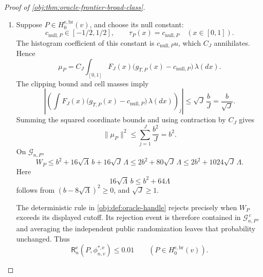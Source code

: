 \begin{proof}[Proof of \cref{obj:thm:oracle-frontier-broad-class}]
\begin{enumerate}
Define the good event by
\[
\mathcal G_{n,P}
=
\left\{\mathcal D_n:
|W_P-\|\mu_P\|^2|
\le16\bigl(\sqrt\Lambda\,\|\mu_P\|+\sqrt J\,\Lambda\bigr)
\right\}.
\]
Its tolerance is strictly positive. Applying the second-moment tail bound gives
\[
\begin{aligned}
\mathbb P_{n,P}(\mathcal G_{n,P}^{\,c})
&\le
\frac{2\Lambda\|\mu_P\|^2+J\Lambda^2}
{256\bigl(\sqrt\Lambda\,\|\mu_P\|+\sqrt J\,\Lambda\bigr)^2}\\
&\le\frac1{128}<0.01.
\end{aligned}
\]
The last inequality uses the nonnegative cross term in the denominator.

\item Suppose \(P\in H_0^{\mathrm{e,br}}(v)\), and choose its null constant:
\[
c_{\mathrm{null},P}\in[-1/2,1/2],
\qquad
\tau_P(x)=c_{\mathrm{null},P}\quad(x\in[0,1]).
\]
The histogram coefficient of this constant is \(c_{\mathrm{null},P}u\), which \(C_J\) annihilates. Hence
\[
\mu_P
=C_J\int_{[0,1]}
F_J(x)\bigl(g_{T,P}(x)-c_{\mathrm{null},P}\bigr)\,\lambda(dx).
\]
The clipping bound and cell masses imply
\[
\left|
\left(\int F_J(x)
\bigl(g_{T,P}(x)-c_{\mathrm{null},P}\bigr)\,\lambda(dx)\right)_j
\right|
\le\sqrt J\,\frac bJ=\frac b{\sqrt J}.
\]
Summing the squared coordinate bounds and using contraction by \(C_J\) gives
\[
\|\mu_P\|^2\le
\sum_{j=1}^J\frac{b^2}{J}=b^2.
\]
On \(\mathcal G_{n,P}\),
\[
W_P
\le b^2+16\sqrt\Lambda\,b+16\sqrt J\,\Lambda
\le2b^2+80\sqrt J\,\Lambda
\le2b^2+1024\sqrt J\,\Lambda.
\]
Here
\[
16\sqrt\Lambda\,b\le b^2+64\Lambda
\]
follows from \((b-8\sqrt\Lambda)^2\ge0\), and \(\sqrt J\ge1\).

The deterministic rule in \cref{obj:def:oracle-handle} rejects precisely when \(W_P\) exceeds its displayed cutoff. Its rejection event is therefore contained in \(\mathcal G_{n,P}^{\,c}\), and averaging the independent public randomization leaves that probability unchanged. Thus
\[
\mathsf R_n^{\mathrm e}(P,\phi^{*,\mathrm e}_{n,v})
\le0.01
\qquad(P\in H_0^{\mathrm{e,br}}(v)).
\]


\end{enumerate}
\end{proof}
